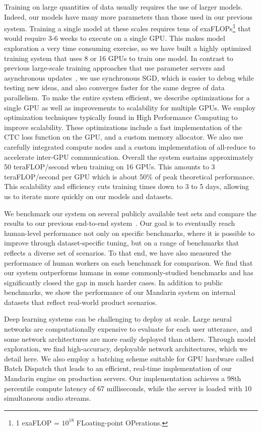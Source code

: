 Training on large quantities of data usually requires the use of larger models.
Indeed, our models have many more parameters than those used in our previous
system. Training a single model at these scales requires tens of
exaFLOPs\footnote{1 exaFLOP = $10^{18}$ FLoating-point OPerations.} that would
require 3-6 weeks to execute on a single GPU. This makes model exploration a
very time consuming exercise, so we have built a highly optimized training
system that uses 8 or 16 GPUs to train one model. In contrast to previous
large-scale training approaches that use parameter servers and asynchronous
updates~\cite{dean2012, chilimbi2014}, we use synchronous SGD, which is easier
to debug while testing new ideas, and also converges faster for the same degree
of data parallelism. To make the entire system efficient, we describe
optimizations for a single GPU as well as improvements to scalability for
multiple GPUs. We employ optimization techniques typically found in High
Performance Computing to improve scalability. These optimizations include a
fast implementation of the CTC loss function on the GPU, and a custom memory
allocator. We also use carefully integrated compute nodes and a custom
implementation of all-reduce to accelerate inter-GPU communication. Overall the
system sustains approximately 50 teraFLOP/second when training on 16 GPUs. This
amounts to 3 teraFLOP/second per GPU which is about 50\% of peak theoretical
performance. This scalability and efficiency cuts training times down to 3 to 5
days, allowing us to iterate more quickly on our models and datasets.

We benchmark our system on several publicly available test sets and compare the
results to our previous end-to-end system~\cite{hannun2014deepspeech}.  Our
goal is to eventually reach human-level performance not only on specific
benchmarks, where it is possible to improve through dataset-specific tuning,
but on a range of benchmarks that reflects a diverse set of scenarios. To that
end, we have also measured the performance of human workers on each benchmark
for comparison.  We find that our system outperforms humans in some
commonly-studied benchmarks and has significantly closed the gap in much harder
cases.  In addition to public benchmarks, we show the performance of our
Mandarin system on internal datasets that reflect real-world product scenarios.

Deep learning systems can be challenging to deploy at scale.  Large neural
networks are computationally expensive to evaluate for each user utterance, and
some network architectures are more easily deployed than others. Through model
exploration, we find high-accuracy, deployable network architectures, which we
detail here. We also employ a batching scheme suitable for GPU hardware called
Batch Dispatch that leads to an efficient, real-time implementation of our
Mandarin engine on production servers.  Our implementation achieves a 98th
percentile compute latency of 67 milliseconds, while the server is loaded with
10 simultaneous audio streams.
